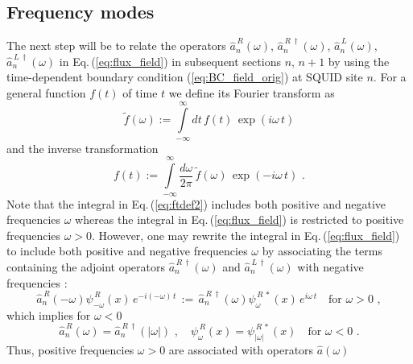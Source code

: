 
\subsection{Frequency modes}
\label{subsec:frequency_modes}

\noindent
The next step will be to relate the operators $\hat{a}_n^{\,R}(\omega)$, $\hat{a}_n^{\,R \, \dagger}(\omega)$,
$\hat{a}_n^{\,L}(\omega)$, $\hat{a}_n^{\,L \, \dagger}(\omega)$ in Eq.\,(\ref{eq:flux_field}) 
in subsequent sections $n$, $n+1$ by using 
the time-dependent boundary condition (\ref{eq:BC_field_orig}) at SQUID site $n$.  
For a general function $f(t)$ of time $t$ we define its Fourier transform as 
%
\begin{equation} \label{eq:ftdef1}
\widetilde{f}(\omega) := \int\limits_{-\infty}^{\infty} dt \, f(t) \, \exp(i \omega \, t) 
\end{equation}  
%
and the inverse transformation
%
\begin{equation} \label{eq:ftdef2}
f(t) := \int\limits_{-\infty}^{\infty} \frac{d\omega}{2 \pi} \, \widetilde{f}(\omega) \, \exp(- i \omega \, t) \, \, .
\end{equation}  
%
Note that the integral in Eq.\,(\ref{eq:ftdef2}) includes both positive and negative frequencies $\omega$
whereas the integral in Eq.\,(\ref{eq:flux_field}) is restricted to positive frequencies $\omega>0$. 
However, one may rewrite the integral in Eq.\,(\ref{eq:flux_field}) to include 
both positive and negative frequencies $\omega$ by associating the terms containing the 
adjoint operators $\hat{a}_n^{\,R \, \dagger}(\omega)$ and $\hat{a}_n^{\,L \, \dagger}(\omega)$ 
with negative frequencies \cite{Johansson2010}:
%
\begin{equation} \label{eq:nf}
\hat{a}_n^{\,R}(-\omega) \psi_{-\omega}^{\,R}(x) \, e^{- i (- \omega) \, t} \, := \,
\hat{a}_n^{\,R \, \dagger}(\omega) \psi_{\omega}^{\,R \, *}(x) \, e^{i \omega \, t} \quad
\text{for} \, \, \omega > 0 \, \, ,
\end{equation}
%
which implies for $\omega<0$
%
\begin{equation} \label{eq:nf2}
\hat{a}_n^{\,R}(\omega) = \hat{a}_n^{\,R\,\dagger}(|\omega|) \, \, , \quad 
\psi_{\omega}^{\,R}(x) = \psi_{|\omega|}^{\,R \, *}(x) \quad
\text{for} \, \, \omega < 0 \, \, .
\end{equation}
%
Thus, positive frequencies $\omega>0$ are associated with operators $\hat{a}(\omega)$
